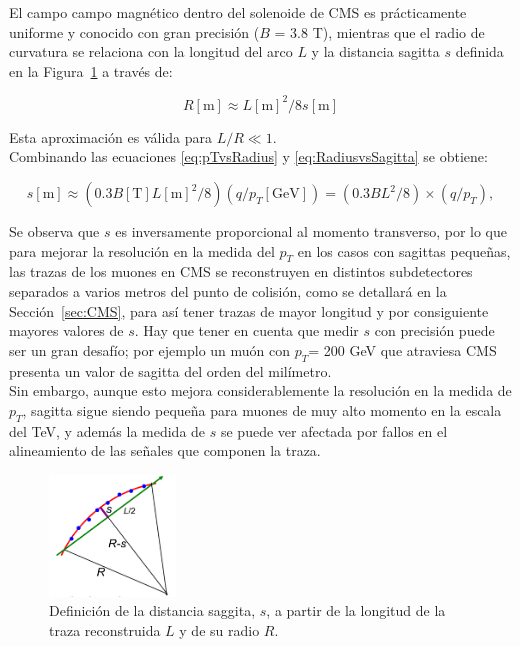 El campo campo magn\'etico dentro del solenoide de CMS es pr\'acticamente uniforme y conocido con gran precisi\'on ($B$ = 3.8 T), mientras que el radio de curvatura se relaciona con la longitud del arco $L$ y la distancia sagitta $s$ definida en la Figura~\ref{fig:SagittaDef} a trav\'es de:

\begin{equation}
  R[\text{m}]\approx L[\text{m}]^{2}/8s[\text{m}]
\label{eq:RadiusvsSagitta}
\end{equation}

Esta aproximaci\'on es v\'alida para $L/R \ll 1$. \\

Combinando las ecuaciones \eqref{eq:pTvsRadius} y \eqref{eq:RadiusvsSagitta} se obtiene:

\begin{equation}
  s[\text{m}]\approx (0.3 B [\text{T}] L[\text{m}]^{2}/8) (q/p_{T}[\text{GeV}]) =  (0.3 BL^{2}/8) \times (q/p_{T}),
\label{eq:SagittavsPt}
\end{equation}

Se observa que $s$ es inversamente proporcional al momento transverso, por lo que para mejorar la resoluci\'on en la medida del $p_{T}$ en los casos con sagittas peque\~nas, las trazas de los muones en CMS se reconstruyen en distintos subdetectores separados a varios metros del punto de colisi\'on, como se detallar\'a en la Secci\'on~\ref{sec:CMS}, para as\'i tener trazas de mayor longitud y por consiguiente mayores valores de $s$. Hay que tener en cuenta que medir $s$ con precisi\'on puede ser un gran desaf\'io; por ejemplo un mu\'on con $p_{T}$= 200 GeV que atraviesa CMS presenta un valor de sagitta del orden del mil\'imetro.  \\
Sin embargo, aunque esto mejora considerablemente la resoluci\'on en la medida de $p_{T}$, sagitta sigue siendo peque\~na para muones de muy alto momento en la escala del TeV, y adem\'as la medida de $s$ se puede ver afectada por fallos en el alineamiento de las se\~nales que componen la traza. \\

\begin{figure}[h]
\centering
\includegraphics[width=0.30\textwidth]{figures/curvaturesketch.png}
\caption{Definici\'on de la distancia saggita, $s$, a partir de la longitud de la traza reconstruida $L$ y de su radio $R$.}
\label{fig:SagittaDef}
\end{figure}

